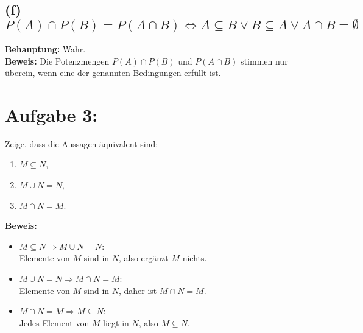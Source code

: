\documentclass[a4paper]{scrartcl}
\begin{document}
\subsection*{(f) \( P(A) \cap P(B) = P(A \cap B) \iff A \subseteq B \lor B \subseteq A \lor A \cap B = \emptyset \)}
\textbf{Behauptung:} Wahr. \\
\textbf{Beweis:} Die Potenzmengen \( P(A) \cap P(B) \) und \( P(A \cap B) \) stimmen nur überein, wenn eine der genannten Bedingungen erfüllt ist.

\section*{Aufgabe 3:}

Zeige, dass die Aussagen äquivalent sind:
\begin{enumerate}
    \item \( M \subseteq N \),
    \item \( M \cup N = N \),
    \item \( M \cap N = M \).
\end{enumerate}

\textbf{Beweis:}
\begin{itemize}
    \item \( M \subseteq N \Rightarrow M \cup N = N \): \\
    Elemente von \( M \) sind in \( N \), also ergänzt \( M \) nichts.
    \item \( M \cup N = N \Rightarrow M \cap N = M \): \\
    Elemente von \( M \) sind in \( N \), daher ist \( M \cap N = M \).
    \item \( M \cap N = M \Rightarrow M \subseteq N \): \\
    Jedes Element von \( M \) liegt in \( N \), also \( M \subseteq N \).
\end{itemize}
\end{document}
